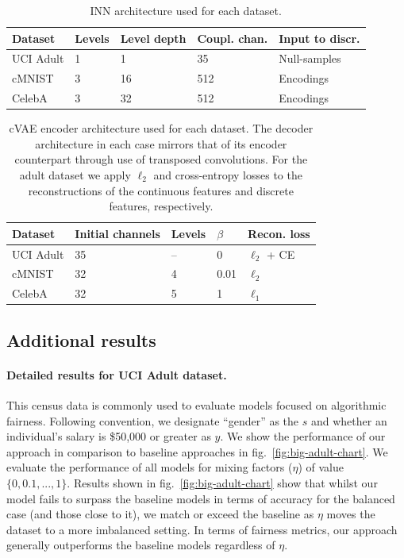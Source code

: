 \begin{table}[tp]
\caption{INN architecture used for each dataset.}
\label{tab:inn_architectures}
\centering
\begin{tabular}{lllll}
\toprule
Dataset & Levels & Level depth & Coupl. chan. & Input to discr. \\ \midrule
UCI Adult                   & 1      & 1     & 35       & Null-samples       \\
cMNIST                      & 3      & 16     & 512      & Encodings               \\
CelebA                      & 3      & 32     & 512      & Encodings        \\ \bottomrule
\end{tabular}
\end{table}

\begin{table}[tp]
\caption{cVAE encoder architecture used for each dataset. The decoder architecture in each case mirrors that of its encoder counterpart through use of transposed convolutions. For the adult dataset we apply $\ell_2$ and cross-entropy losses to the reconstructions of the continuous features and discrete features, respectively.}
\label{tab:vae_architectures}
\centering
\begin{tabular}{lllll}
\toprule
Dataset   & Initial channels & Levels & $\beta$ & Recon. loss \\
\midrule
UCI Adult & 35               & --     & 0       & $\ell_2$ + CE\\
cMNIST    & 32               & 4      & 0.01    & $\ell_2$ \\
CelebA    & 32               & 5      & 1       & $\ell_1$ \\ 
\bottomrule
\end{tabular}
\end{table}

\subsection{Additional results}\label{sec:additional-results}
\paragraph{Detailed results for UCI Adult dataset.}
This census data is commonly used to evaluate models focused on algorithmic fairness.
Following convention, we designate ``gender'' as the $s$ and whether an individual's salary is \$50,000 or greater as $y$.
We show the performance of our approach in comparison to baseline approaches in fig.~\ref{fig:big-adult-chart}.
We evaluate the performance of all models for mixing factors ($\eta$) of value $\{0, 0.1, ..., 1\}$. 
Results shown in fig.~\ref{fig:big-adult-chart} show that whilst our model fails to surpass the baseline models in terms of accuracy for the balanced case (and those close to it), we match or exceed the baseline as $\eta $ moves the dataset to a more imbalanced setting. In terms of fairness metrics,  our approach generally outperforms the baseline models regardless of $\eta$.

